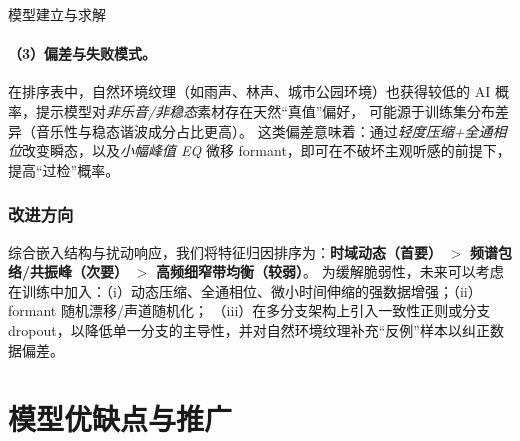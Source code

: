 \documentclass[aspectratio=169]{beamer}
\begin{document}
\begin{frame}{模型建立与求解}
\paragraph{（3）偏差与失败模式。}
在排序表中，自然环境纹理（如雨声、林声、城市公园环境）也获得较低的 AI 概率，提示模型对\emph{非乐音/非稳态}素材存在天然“真值”偏好，
可能源于训练集分布差异（音乐性与稳态谐波成分占比更高）。
这类偏差意味着：通过\emph{轻度压缩+全通相位}改变瞬态，以及\emph{小幅峰值 EQ} 微移 formant，即可在不破坏主观听感的前提下，提高“过检”概率。

\subsubsection{改进方向}
综合嵌入结构与扰动响应，我们将特征归因排序为：\textbf{时域动态（首要）} $>$ \textbf{频谱包络/共振峰（次要）} $>$ \textbf{高频细窄带均衡（较弱）}。
为缓解脆弱性，未来可以考虑在训练中加入：（i）动态压缩、全通相位、微小时间伸缩的强数据增强；（ii）formant 随机漂移/声道随机化；
（iii）在多分支架构上引入一致性正则或分支 dropout，以降低单一分支的主导性，并对自然环境纹理补充“反例”样本以纠正数据偏差。
\end{frame}

\section{模型优缺点与推广}
\end{document}
